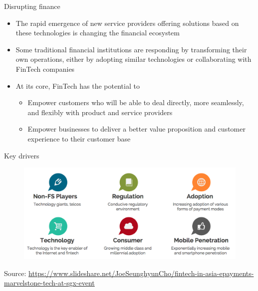\documentclass[10pt]{beamer}
\begin{document}

\begin{frame}{Disrupting finance}
	\begin{itemize}
		\item The rapid emergence of new service providers offering solutions based on these technologies is changing the financial ecosystem
		\item Some traditional financial institutions are responding by transforming their own operations, either by adopting similar technologies or collaborating with FinTech companies
		\item At its core, FinTech has the potential to
		\begin{itemize}
			\item Empower customers who will be able to deal directly, more seamlessly, and flexibly with product and service providers
			\item Empower businesses to deliver a better value proposition and customer experience to their customer base
		\end{itemize}
	\end{itemize}
\end{frame}


\begin{frame}{Key drivers}
	\begin{figure}[]
		\centering
		\includegraphics  [scale=0.25]{Images/drivers.png}
	\end{figure}
	\begin{tiny}
		Source: \href{https://www.slideshare.net/JoeSeunghyunCho/fintech-in-asia-epayments-marvelstone-tech-at-sgx-event}{https://www.slideshare.net/JoeSeunghyunCho/fintech-in-asia-epayments-marvelstone-tech-at-sgx-event}
	\end{tiny}
\end{frame}
\end{document}
